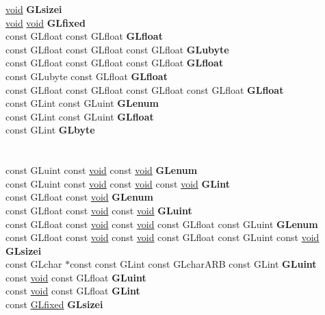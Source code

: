 \begin{DoxyCompactItemize}
\begin{tabbing}
\>\hyperlink{interfacevoid}{void} {\bfseries GLsizei}\\
\>\hyperlink{interfacevoid}{void} \hyperlink{interfacevoid}{void} {\bfseries GLfixed}\\
\>const GLfloat const GLfloat {\bfseries GLfloat}\\
\>const GLfloat const GLfloat const GLfloat {\bfseries GLubyte}\\
\>const GLfloat const GLfloat const GLfloat {\bfseries GLfloat}\\
\>const GLubyte const GLfloat {\bfseries GLfloat}\\
\>const GLfloat const GLfloat const GLfloat const GLfloat {\bfseries GLfloat}\\
\>const GLint const GLuint {\bfseries GLenum}\\
\>const GLint const GLuint {\bfseries GLfloat}\\
\>const GLint {\bfseries GLbyte}\\
\\
\\
\>const GLuint const \hyperlink{interfacevoid}{void} const \hyperlink{interfacevoid}{void} {\bfseries GLenum}\\
\>const GLuint const \hyperlink{interfacevoid}{void} const \hyperlink{interfacevoid}{void} const \hyperlink{interfacevoid}{void} {\bfseries GLint}\\
\>const GLfloat const \hyperlink{interfacevoid}{void} {\bfseries GLenum}\\
\>const GLfloat const \hyperlink{interfacevoid}{void} const \hyperlink{interfacevoid}{void} {\bfseries GLuint}\\
\>const GLfloat const \hyperlink{interfacevoid}{void} const \hyperlink{interfacevoid}{void} const GLfloat const GLuint {\bfseries GLenum}\\
\>const GLfloat const \hyperlink{interfacevoid}{void} const \hyperlink{interfacevoid}{void} const GLfloat const GLuint const \hyperlink{interfacevoid}{void} {\bfseries GLsizei}\\
\>const GLchar $\ast$const const GLint const GLcharARB const GLint {\bfseries GLuint}\\
\>const \hyperlink{interfacevoid}{void} const GLfloat {\bfseries GLuint}\\
\>const \hyperlink{interfacevoid}{void} const GLfloat {\bfseries GLint}\\
\>const \hyperlink{glheader_8h_ad6d3fa892df40dedf48ee6d84529ae5e}{GLfixed} {\bfseries GLsizei}\\

\end{tabbing}
\end{DoxyCompactItemize}
